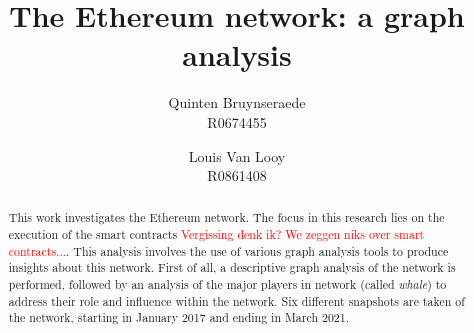 \documentclass[10pt,a4paper]{article}
\author{Quinten Bruynseraede  \\ R0674455 \and Louis Van Looy \\ R0861408}
\title{The Ethereum network: a graph analysis}
\newcommand{\todo}[1]{\textcolor{red}{#1}}
\begin{document}
\maketitle

\begin{abstract}
	
This work investigates the Ethereum network. The focus in this research lies on the execution of the smart contracts \todo{Vergissing denk ik? We zeggen niks over smart contracts...}. This analysis involves the use of various graph analysis tools to produce insights about this network. First of all, a descriptive graph analysis of the network is performed, followed by an analysis of the major players in network (called \textit {whale}) to address their role and influence within the network. Six different snapshots are taken of the network, starting in January 2017 and ending in March 2021. 

\end{abstract}
\end{document}
